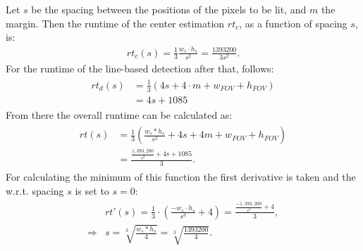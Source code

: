 \documentclass[journal,final,a4paper,twoside]{PS}
\begin{document}
Let $s$ be the spacing between the positions of the pixels to be lit, and $m$ the margin. Then the runtime of the center estimation $rt_c$, as a function of spacing $s$, is:
\begin{align}
rt_c (s) =\frac{1}{3} \frac{w_s\cdot h_s}{ s^2} =\frac{1393200}{3s^2} .
\end{align}
For the runtime of the line-based detection after that, follows:
\begin{align}\begin{split}
rt_d (s) &=\frac{1}{3}\left( 4s + 4\cdot m + w_{FOV} + h_{FOV}\right)\\& = 4s + 1085\end{split}
\end{align}
From there the overall runtime can be calculated as:
\begin{align}\begin{split}
rt(s) &=\frac{1}{3}\left(\frac{w_s*h_s}{s^2} + 4s + 4m + w_{FOV} + h_{FOV}\right)\\& = \frac{\frac{1,393,200}{s^2} + 4s +1085}{3}.\end{split}
\end{align}
For calculating the minimum of this function the first derivative is taken and the w.r.t. spacing $s$ is set to $s=0$:
\begin{align}\begin{split}
&rt’(s) = \frac{1}{3} \cdot \left( \frac{-w_s \cdot h_s}{s^3 }  + 4\right) = \frac{ \frac{-1,393,200}{s^3}+ 4}{3},\\
\Rightarrow &s = \sqrt[3]{\frac{w_s * h_s}{4}} = \sqrt[3]{\frac{1393200}{4}}. \end{split}
\end{align}
\end{document}
